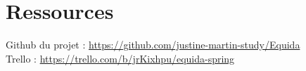 \chapter{Ressources}

\noindent
Github du projet : \url{https://github.com/justine-martin-study/Equida}\\
Trello : \url{https://trello.com/b/jrKixhpu/equida-spring}
